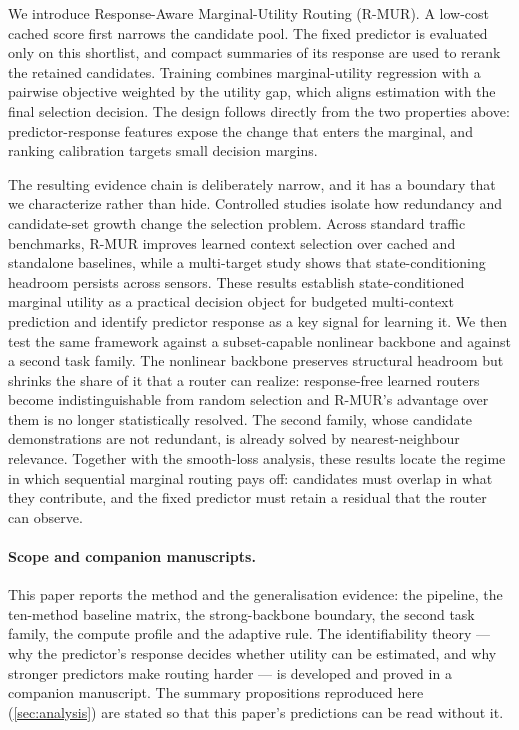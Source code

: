 We introduce Response-Aware Marginal-Utility Routing (R-MUR). A low-cost cached
score first narrows the candidate pool. The fixed predictor is evaluated only
on this shortlist, and compact summaries of its response are used to rerank the
retained candidates. Training combines marginal-utility regression with a
pairwise objective weighted by the utility gap, which aligns estimation with
the final selection decision. The design follows directly from the two
properties above: predictor-response features expose the change that enters
the marginal, and ranking calibration targets small decision margins.

The resulting evidence chain is deliberately narrow, and it has a boundary
that we characterize rather than hide. Controlled studies isolate how
redundancy and candidate-set growth change the selection problem. Across
standard traffic benchmarks, R-MUR improves learned context selection over
cached and standalone baselines, while a multi-target study shows that
state-conditioning headroom persists across sensors. These results establish
state-conditioned marginal utility as a practical decision object for budgeted
multi-context prediction and identify predictor response as a key signal for
learning it. We then test the same framework against a subset-capable
nonlinear backbone and against a second task family. The nonlinear backbone
preserves structural headroom but shrinks the share of it that a router can
realize: response-free learned routers become indistinguishable from random
selection and R-MUR's advantage over them is no longer statistically resolved.
The second family, whose candidate demonstrations are not redundant, is already
solved by nearest-neighbour relevance. Together with the smooth-loss analysis,
these results locate the regime in which sequential marginal routing pays off:
candidates must overlap in what they contribute, and the fixed predictor must
retain a residual that the router can observe.

\paragraph{Scope and companion manuscripts.} This paper reports the method and
the generalisation evidence: the pipeline, the ten-method baseline matrix, the
strong-backbone boundary, the second task family, the compute profile and the
adaptive rule. The identifiability theory --- why the predictor's response
decides whether utility can be estimated, and why stronger predictors make
routing harder --- is developed and proved in a companion manuscript. The
summary propositions reproduced here (\cref{sec:analysis}) are stated so that
this paper's predictions can be read without it.
